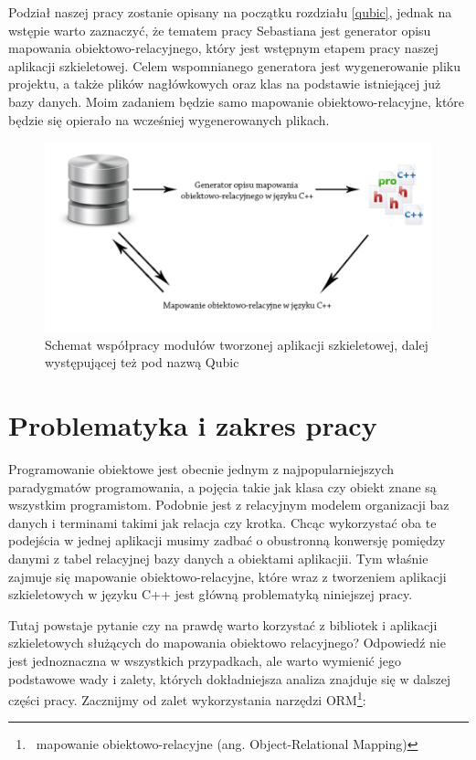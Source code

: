 \documentclass[12pt]{report}
\begin{document}
Podział naszej pracy zostanie opisany na początku rozdziału \ref{qubic}, jednak na wstępie warto zaznaczyć, że tematem pracy Sebastiana jest generator opisu mapowania 
obiektowo-relacyjnego, który jest wstępnym etapem pracy naszej aplikacji szkieletowej. Celem wspomnianego generatora jest wygenerowanie pliku projektu, a także plików
nagłówkowych oraz klas na podstawie istniejącej już bazy danych. Moim zadaniem będzie samo mapowanie obiektowo-relacyjne, które będzie się opierało na wcześniej
wygenerowanych plikach. 

\begin{figure}[h]
\centering
\includegraphics[width=\textwidth]{resources/coop.png}
\caption[Schemat współpracy modułów tworzonej aplikacji szkieletowej]{Schemat współpracy modułów tworzonej aplikacji szkieletowej, dalej występującej też pod nazwą Qubic}
\end{figure}

\section{Problematyka i zakres pracy}

Programowanie obiektowe jest obecnie jednym z najpopularniejszych pa\-ra\-dy\-gma\-tów programowania, a pojęcia takie jak klasa czy obiekt znane są wszystkim programistom.
Podobnie jest z relacyjnym modelem organizacji baz danych i terminami takimi jak relacja czy krotka. Chcąc wykorzystać oba te podejścia w jednej aplikacji musimy zadbać o 
obustronną konwersję pomiędzy danymi z tabel relacyjnej bazy danych a obiektami aplikacjii. Tym właśnie zajmuje się mapowanie obiektowo-relacyjne, które wraz z tworzeniem 
aplikacji szkieletowych w języku C++ jest główną problematyką niniejszej pracy.

Tutaj powstaje pytanie czy na prawdę warto korzystać z bibliotek i aplikacji szkieletowych służących do mapowania obiektowo relacyjnego? Od\-po\-wiedź nie jest
jednoznaczna w wszystkich przypadkach, ale warto wymienić jego podstawowe wady i zalety, których dokładniejsza analiza znajduje się w dalszej części pracy. Zacznijmy od zalet 
wykorzystania narzędzi ORM\footnote{~mapowanie obiektowo-relacyjne (ang. Object-Relational Mapping)}:
\end{document}
